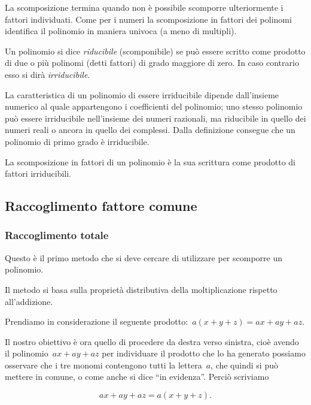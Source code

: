 La scomposizione termina quando non è possibile scomporre ulteriormente i 
fattori individuati.
Come per i numeri la scomposizione in fattori dei polinomi identifica il 
polinomio in maniera univoca (a meno di multipli).

\begin{definizione}
Un polinomio si dice \emph{riducibile} (scomponibile) se può essere scritto 
come prodotto di due o più polinomi (detti fattori) di grado maggiore di zero.
In caso contrario esso si dirà \emph{irriducibile}.
\end{definizione}

La caratteristica di un polinomio di essere irriducibile dipende dall'insieme 
numerico al quale appartengono i coefficienti del polinomio;
uno stesso polinomio può essere irriducibile nell'insieme dei numeri 
razionali, ma riducibile in quello dei numeri reali o ancora in quello dei 
complessi.
Dalla definizione consegue che un polinomio di primo grado è irriducibile.

\begin{definizione}
La scomposizione in fattori di un polinomio è la sua scrittura come prodotto 
di fattori irriducibili.
\end{definizione}

\subsection{Raccoglimento fattore comune}
\label{subsec:divpol_fattorecomune}

\subsubsection{Raccoglimento totale}
Questo è il primo metodo che si deve cercare di utilizzare per scomporre un 
polinomio.

Il metodo si basa sulla proprietà distributiva della moltiplicazione rispetto 
all'addizione.

Prendiamo in considerazione il seguente prodotto:~$a(x+y+z)=ax+ay+az$.

Il nostro obiettivo è ora quello di procedere da destra verso sinistra, 
cioè avendo il polinomio~$ax+ay+az$ per individuare il 
prodotto che lo ha generato possiamo osservare che i tre monomi contengono 
tutti la lettera~$a$, che quindi si può mettere in comune,
o come anche si dice ``in evidenza''. Perciò scriviamo 

\[ax+ay+az=a(x+y+z).\]

